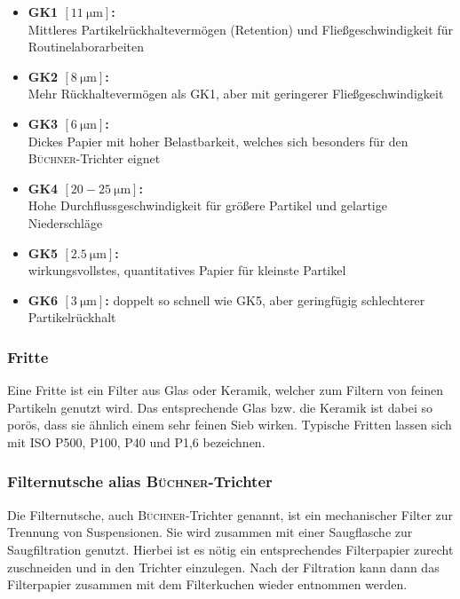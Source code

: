 	\begin{itemize}
		\item \textbf{GK1 $\left[\SI{11}{\micro \meter}\right]$:} \\
		Mittleres Partikelrückhaltevermögen (Retention) und Fließgeschwindigkeit für Routinelaborarbeiten		
		\item \textbf{GK2 $\left[\SI{8}{\micro \meter}\right]$:}\\
		Mehr Rückhaltevermögen als GK1, aber mit geringerer Fließgeschwindigkeit
		\item \textbf{GK3 $\left[\SI{6}{\micro \meter}\right]$:}\\
		Dickes Papier mit hoher Belastbarkeit, welches sich besonders für den \textsc{Büchner}-Trichter eignet
		\item \textbf{GK4 $\left[\text{20}-\SI{25}{\micro \meter}\right]$:}\\
		Hohe Durchflussgeschwindigkeit für größere Partikel und gelartige Niederschläge
		\item \textbf{GK5 $\left[\SI{2,5}{\micro \meter}\right]$:}\\ wirkungsvollstes, quantitatives Papier für kleinste Partikel
		\item \textbf{GK6 $\left[\SI{3}{\micro \meter}\right]$:} doppelt so schnell wie GK5, aber geringfügig schlechterer Partikelrückhalt
\end{itemize}

\newpage
\subsubsection{Fritte}
Eine Fritte ist ein Filter aus Glas oder Keramik, welcher zum Filtern von feinen Partikeln genutzt wird. Das entsprechende Glas bzw. die Keramik ist dabei so porös, dass sie ähnlich einem sehr feinen Sieb wirken. Typische Fritten lassen sich mit ISO P500, P100, P40 und P1,6 bezeichnen.

\subsubsection{Filternutsche alias \textsc{Büchner}-Trichter}
Die Filternutsche, auch \textsc{Büchner}-Trichter genannt, ist ein mechanischer Filter zur Trennung von Suspensionen. Sie wird zusammen mit einer Saugflasche zur Saugfiltration genutzt. Hierbei ist es nötig ein entsprechendes Filterpapier zurecht zuschneiden und in den Trichter einzulegen. Nach der Filtration kann dann das Filterpapier zusammen mit dem Filterkuchen wieder entnommen werden.\\

